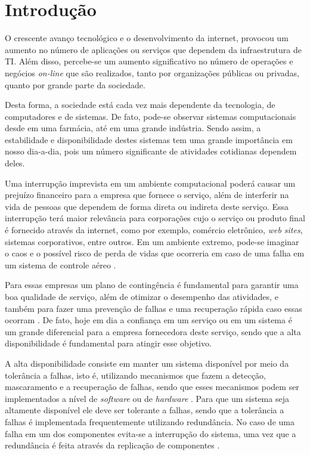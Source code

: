 \chapter{Introdução}
O crescente avanço tecnológico e o desenvolvimento da internet, provocou um aumento no número de aplicações ou serviços que dependem da 
infraestrutura de \ac{TI}. Além disso, percebe-se um aumento significativo no número de operações e negócios \textit{on-line} que são realizados, 
tanto por organizações públicas ou privadas, quanto por grande parte da sociedade.

Desta forma, a sociedade está cada vez mais dependente da tecnologia, de computadores e de sistemas. 
De fato, pode-se observar sistemas computacionais desde em uma farmácia, até em uma grande indústria. 
Sendo assim, a estabilidade e disponibilidade destes sistemas tem uma grande importância em nosso dia-a-dia, 
pois um número significante de atividades cotidianas dependem deles.

Uma interrupção imprevista em um ambiente computacional poderá causar um prejuízo financeiro para a empresa que fornece o serviço, 
além de interferir na vida de pessoas que dependem de forma direta ou indireta deste serviço. 
Essa interrupção terá maior relevância para corporações cujo o serviço ou produto final é fornecido através da internet, 
como por exemplo, comércio eletrônico, \textit{web sites}, sistemas corporativos, entre outros. 
Em um ambiente extremo, pode-se imaginar o caos e o possível risco de perda de vidas que ocorreria em caso de uma falha 
em um sistema de controle aéreo \cite{costa2009}.

Para essas empresas um plano de contingência é fundamental para garantir uma boa qualidade de serviço, além de
otimizar o desempenho das atividades, e também para fazer uma prevenção de falhas e uma recuperação rápida caso essas ocorram \cite{costa2009}.
De fato, hoje em dia a confiança em um serviço ou em um sistema é um grande diferencial para a empresa fornecedora deste serviço, 
sendo que a alta disponibilidade é fundamental para atingir esse objetivo.

A alta disponibilidade consiste em manter um sistema disponível por meio da tolerância a falhas, isto é, utilizando mecanismos que fazem a 
detecção, mascaramento e a recuperação de falhas, sendo que esses mecanismos podem ser implementados a nível de \textit{software} ou de 
\textit{hardware} \cite{reis2009}. Para que um sistema seja altamente disponível ele deve ser tolerante a falhas, sendo que a tolerância
a falhas é implementada frequentemente utilizando redundância. No caso de uma falha em um dos componentes evita-se a interrupção do sistema,
uma vez que a redundância é feita através da replicação de componentes \cite{batista2007}.

